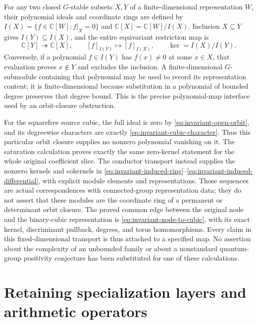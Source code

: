 For any two closed $G$-stable subsets $X,Y$ of a finite-dimensional
representation $W$, their polynomial ideals and coordinate rings
are defined by
$I(X)=\{f\in\mathbb C[W]:f|_X=0\}$ and
$\mathbb C[X]=\mathbb C[W]/I(X)$. Inclusion $X\subseteq Y$ gives
$I(Y)\subseteq I(X)$, and the entire equivariant restriction map is
\[
 \mathbb C[Y]\twoheadrightarrow\mathbb C[X],\qquad
 [f]_{I(Y)}\longmapsto[f]_{I(X)},\qquad
 \ker=I(X)/I(Y).
\]
Conversely, if a polynomial $f\in I(Y)$ has $f(x)\ne0$ at some
$x\in X$, that evaluation proves $x\notin Y$ and excludes the
inclusion. A finite-dimensional $G$-submodule containing that
polynomial may be used to record its representation content; it
is finite-dimensional because substitution in a polynomial of
bounded degree preserves that degree bound. This is the precise
polynomial-map interface used by an orbit-closure obstruction.

For the squarefree source cubic, the full ideal is zero by
\eqref{eq:invariant-open-orbit}, and its degreewise characters are
exactly \eqref{eq:invariant-cubic-character}. Thus this particular
orbit closure supplies no nonzero polynomial vanishing on it.
The saturation calculation proves exactly the same zero-kernel
statement for the whole original coefficient slice. The conductor
transport instead supplies the nonzero kernels and cokernels in
\eqref{eq:invariant-induced-ring}--\eqref{eq:invariant-induced-differential},
with explicit module elements and representations. Those sequences
are actual correspondences with connected-group representation
data; they do not assert that these modules are the coordinate ring
of a permanent or determinant orbit closure. The proved common
edge between the original node and the binary-cubic representation
is \eqref{eq:invariant-node-to-cubic}, with its exact kernel,
discriminant pullback, degrees, and torus homomorphisms. Every claim
in this fixed-dimensional transport is thus attached to a specified
map. No assertion about the complexity of an unbounded family or
about a nonstandard quantum-group positivity conjecture has been
substituted for one of these calculations.

\section{Retaining specialization layers and arithmetic operators}
\label{sec:specialization}

